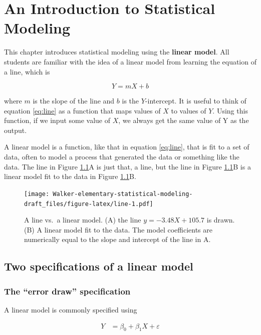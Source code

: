 \documentclass[]{book}
\begin{document}
\chapter{An Introduction to Statistical
Modeling}\label{an-introduction-to-statistical-modeling}

This chapter introduces statistical modeling using the \textbf{linear
model}. All students are familiar with the idea of a linear model from
learning the equation of a line, which is

\begin{equation}
Y = mX + b
\label{eq:line}
\end{equation}

where \(m\) is the slope of the line and \(b\) is the \(Y\)-intercept.
It is useful to think of equation \eqref{eq:line} as a function that maps
values of \(X\) to values of \(Y\). Using this function, if we input
some value of \(X\), we always get the same value of Y as the output.

A linear model is a function, like that in equation \eqref{eq:line}, that
is fit to a set of data, often to model a process that generated the
data or something like the data. The line in Figure \ref{fig:line}A is
just that, a line, but the line in Figure \ref{fig:line}B is a linear
model fit to the data in Figure \ref{fig:line}B.

\begin{figure}
\centering
\texttt{[image: Walker-elementary-statistical-modeling-draft\_files/figure-latex/line-1.pdf]}
\caption{\label{fig:line}A line vs.~a linear model. (A) the line
\(y=-3.48X + 105.7\) is drawn. (B) A linear model fit to the data. The
model coefficients are numerically equal to the slope and intercept of
the line in A.}
\end{figure}

\section{Two specifications of a linear
model}\label{two-specifications-of-a-linear-model}

\subsection{\texorpdfstring{The ``error draw''
specification}{The error draw specification}}\label{the-error-draw-specification}

A linear model is commonly specified using

\begin{align}
Y &= \beta_0 + \beta_1 X + \varepsilon\\
\label{eq:lm}
\end{align}
\end{document}
